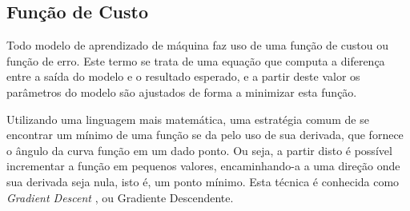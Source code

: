 



\subsection{\textbf{Função de Custo}}

Todo modelo de aprendizado de máquina faz uso de uma função de custou ou função de erro. Este termo se trata de uma equação que computa a diferença entre a saída do modelo e o resultado esperado, e a partir deste valor os parâmetros do modelo são ajustados de forma a minimizar esta função. 

Utilizando uma linguagem mais matemática, uma estratégia comum de se encontrar um mínimo de uma função se da pelo uso de sua derivada, que fornece o ângulo da curva função em um dado ponto. Ou seja, a partir disto é possível incrementar a função em pequenos valores, encaminhando-a a uma direção onde sua derivada seja nula, isto é, um ponto mínimo. Esta técnica é conhecida como \textit{Gradient Descent} \cite{cauchy}, ou Gradiente Descendente. 




